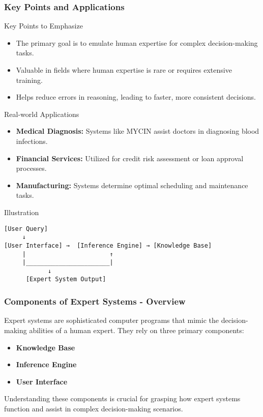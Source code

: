 \documentclass[aspectratio=169]{beamer}
\begin{document}
\begin{frame}[fragile]
    \frametitle{Key Points and Applications}
    \begin{block}{Key Points to Emphasize}
        \begin{itemize}
            \item The primary goal is to emulate human expertise for complex decision-making tasks.
            \item Valuable in fields where human expertise is rare or requires extensive training.
            \item Helps reduce errors in reasoning, leading to faster, more consistent decisions.
        \end{itemize}
    \end{block}

    \begin{block}{Real-world Applications}
        \begin{itemize}
            \item \textbf{Medical Diagnosis:} Systems like MYCIN assist doctors in diagnosing blood infections.
            \item \textbf{Financial Services:} Utilized for credit risk assessment or loan approval processes.
            \item \textbf{Manufacturing:} Systems determine optimal scheduling and maintenance tasks.
        \end{itemize}
    \end{block}

    \begin{block}{Illustration}
        \begin{verbatim}
[User Query]
     ↓
[User Interface] →  [Inference Engine] → [Knowledge Base]
     |                       ↑
     |_______________________|
            ↓
      [Expert System Output]
        \end{verbatim}
    \end{block}
\end{frame}

\begin{frame}[fragile]
    \frametitle{Components of Expert Systems - Overview}
    Expert systems are sophisticated computer programs that mimic the decision-making abilities of a human expert. They rely on three primary components: 
    \begin{itemize}
        \item \textbf{Knowledge Base}
        \item \textbf{Inference Engine}
        \item \textbf{User Interface}
    \end{itemize}
    Understanding these components is crucial for grasping how expert systems function and assist in complex decision-making scenarios.
\end{frame}
\end{document}
